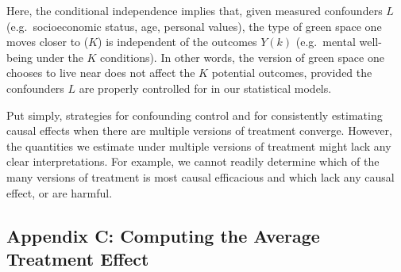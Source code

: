 \documentclass[
  singlecolumn]{article}
\begin{document}
Here, the conditional independence implies that, given measured
confounders \(L\) (e.g.~socioeconomic status, age, personal values), the
type of green space one moves closer to (\(K\)) is independent of the
outcomes \(Y(k)\) (e.g.~mental well-being under the \(K\) conditions).
In other words, the version of green space one chooses to live near does
not affect the \(K\) potential outcomes, provided the confounders \(L\)
are properly controlled for in our statistical models.

Put simply, strategies for confounding control and for consistently
estimating causal effects when there are multiple versions of treatment
converge. However, the quantities we estimate under multiple versions of
treatment might lack any clear interpretations. For example, we cannot
readily determine which of the many versions of treatment is most causal
efficacious and which lack any causal effect, or are harmful.

\subsection{Appendix C: Computing the Average Treatment
Effect}\label{appendix-c-computing-the-average-treatment-effect}
\end{document}
